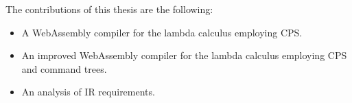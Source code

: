 The contributions of this thesis are the following:
\begin{itemize}
\item A WebAssembly compiler for the lambda calculus employing CPS.
\item An improved WebAssembly compiler for the lambda calculus employing CPS and command trees.
\item An analysis of \ac{IR} requirements.
\end{itemize}
